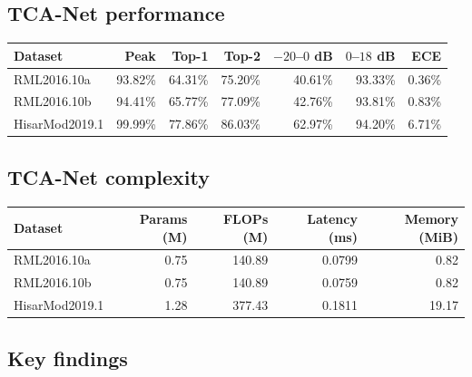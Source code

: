 \documentclass[11pt,a4paper]{article}
\begin{document}
\subsection{TCA-Net performance}

\begin{center}
\small
\begin{tabular}{lrrrrrr}
\toprule
Dataset & Peak & Top-1 & Top-2 & $-20$--$0$ dB & $0$--$18$ dB & ECE \\
\midrule
RML2016.10a & 93.82\% & 64.31\% & 75.20\% & 40.61\% & 93.33\% & 0.36\% \\
RML2016.10b & 94.41\% & 65.77\% & 77.09\% & 42.76\% & 93.81\% & 0.83\% \\
HisarMod2019.1 & 99.99\% & 77.86\% & 86.03\% & 62.97\% & 94.20\% & 6.71\% \\
\bottomrule
\end{tabular}
\end{center}

\subsection{TCA-Net complexity}

\begin{center}
\small
\begin{tabular}{lrrrr}
\toprule
Dataset & Params (M) & FLOPs (M) & Latency (ms) & Memory (MiB) \\
\midrule
RML2016.10a & 0.75 & 140.89 & 0.0799 & 0.82 \\
RML2016.10b & 0.75 & 140.89 & 0.0759 & 0.82 \\
HisarMod2019.1 & 1.28 & 377.43 & 0.1811 & 19.17 \\
\bottomrule
\end{tabular}
\end{center}

\subsection{Key findings}
\end{document}
